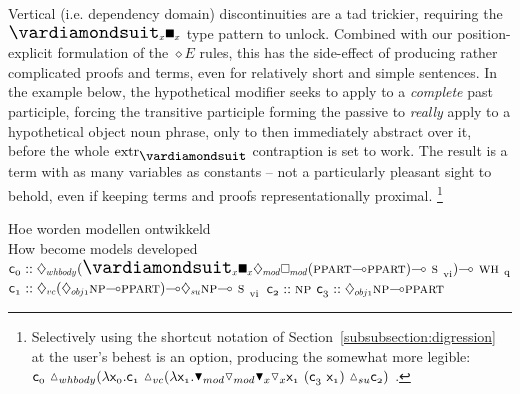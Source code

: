 Vertical (i.e. dependency domain) discontinuities are a tad trickier, requiring the $\dxdia{x}\dxbox{x}$ type pattern to unlock.
Combined with our position-explicit formulation of the $\diamond E$ rules, this has the side-effect of producing rather complicated proofs and terms, even for relatively short and simple sentences.
In the example below, the hypothetical modifier seeks to apply to a \textit{complete} past participle, forcing the transitive participle forming the passive to \textit{really} apply to a hypothetical object noun phrase, only to then immediately abstract over it, before the whole $\Extraction$ contraption is set to work.
The result is a term with as many variables as constants -- not a particularly pleasant sight to behold, even if keeping terms and proofs representationally proximal.%
	\footnote{Selectively using the shortcut notation of Section~\ref{subsubsection:digression} at the user's behest is an option, producing the somewhat more legible: $
			\con{0}~\ddiaintro{whbody}(
				\lam \Var{0}.
				\con{1}
				~\ddiaintro{vc}(\lam \Var{1}.\dboxelim{mod}\ddiaelim{mod}\dboxelim{x}\ddiaelim{x}\Var{1}~(\con{3}~\Var{1})
				~\ddiaintro{su}\con{2}				
			)
$
	 .}
\begin{exe}
\glll Hoe worden modellen ontwikkeld\\
How become models developed\\
	$\con{0}::\ddia{whbody}(\dxdia{x}\dxbox{x}\ddia{mod}\dbox{mod}(\ppart[s]\li\ppart[s])\li\svi[s])\li\whq[s]$
	$\con{1}::\ddia{vc}(\ddia{obj1}\np[s]\li\ppart[s])\li\ddia{su}\np[s]\li\svi[s]$
	$\con{2}::\np[s]$
	$\con{3}::\ddia{obj1}\np[s]\li\ppart[s]$\\
\end{exe}

